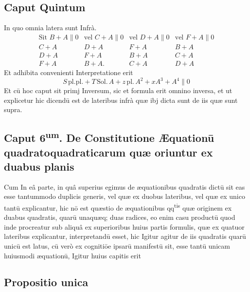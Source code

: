 \documentclass[11pt,a4paper]{article}
\begin{document}
\subsection*{Caput Quintum}

In quo omnia latera sunt Infrà.
\[ \begin{array}{llll} \text{Sit } B + A \parallel 0 & \text{vel } C + A \parallel 0 & \text{vel } D + A \parallel 0 & \text{vel } F + A \parallel 0 \\ C + A & D + A & F + A & B + A \\ D + A & F + A & B + A & C + A \\ F + A & B + A. & C + A & D + A \end{array} \]
Et adhibita convenienti Interpretatione erit
\[ S\,\mathrm{pl.pl.} + T\,\mathrm{Sol.}\,A + z\,\mathrm{pl.}\,A^{2} + xA^{3} + A^{4} \parallel 0 \]
Et cū hoc caput sit primj Inversum, sic et formula erit omnino inversa, et ut explicetur hic dicendū est de lateribus infrà quæ ibj dicta sunt de iis quæ sunt supra.


\subsection*{Caput 6\textsuperscript{um}. De Constitutione Æquationū quadratoquadraticarum quæ oriuntur ex duabus planis}

Cum In eâ parte, in quâ superius egimus de æquationibus quadratis dictū sit eas esse tantummodo duplicis generis, vel quæ ex duobus lateribus, vel quæ ex unico tantū explicantur, hic nō est quæstio de æquationibus qq\textsuperscript{tis} quæ originem ex duabus quadratis, quarū unaquæq; duas radices, eo enim casu productū quod inde procreatur sub aliquâ ex superioribus huius partis formulis, quæ ex quatuor lateribus explicantur, interpretandū esset, hic Igitur agitur de iis quadratis quarū unicū est latus, cū verò ex cognitiōe ipsarū manifestū sit, esse tantū unicam huiusmodi æquationū, Igitur huius capitis erit

\subsection*{Propositio unica}
\end{document}
